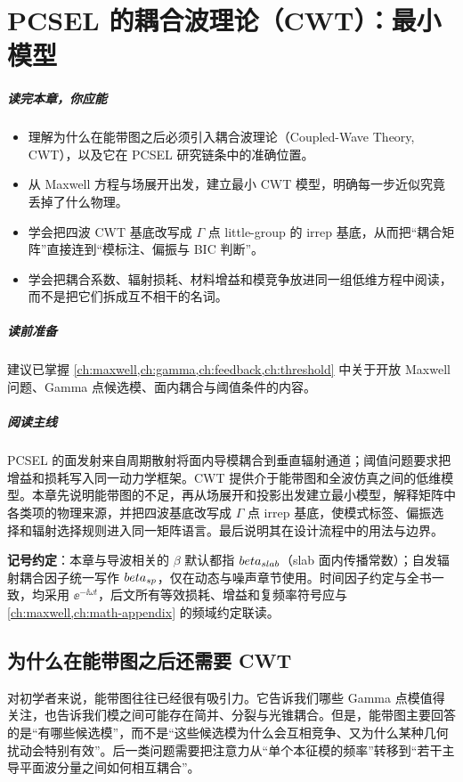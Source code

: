 \chapter{PCSEL 的耦合波理论（CWT）：最小模型}
\label{ch:cwt-min}

\paragraph{读完本章，你应能}
\begin{itemize}
  \item 理解为什么在能带图之后必须引入耦合波理论（Coupled-Wave Theory, CWT），以及它在 PCSEL 研究链条中的准确位置。
  \item 从 Maxwell 方程与场展开出发，建立最小 CWT 模型，明确每一步近似究竟丢掉了什么物理。
  \item 学会把四波 CWT 基底改写成 $\Gamma$ 点 little-group 的 irrep 基底，从而把“耦合矩阵”直接连到“模标注、偏振与 BIC 判断”。
  \item 学会把耦合系数、辐射损耗、材料增益和模竞争放进同一组低维方程中阅读，而不是把它们拆成互不相干的名词。
\end{itemize}

\paragraph{读前准备}
建议已掌握 \cref{ch:maxwell,ch:gamma,ch:feedback,ch:threshold} 中关于开放 Maxwell 问题、Gamma 点候选模、面内耦合与阈值条件的内容。

\paragraph{阅读主线}
PCSEL 的面发射来自周期散射将面内导模耦合到垂直辐射通道；阈值问题要求把增益和损耗写入同一动力学框架。CWT 提供介于能带图和全波仿真之间的低维模型。本章先说明能带图的不足，再从场展开和投影出发建立最小模型，解释矩阵中各类项的物理来源，并把四波基底改写成 $\Gamma$ 点 irrep 基底，使模式标签、偏振选择和辐射选择规则进入同一矩阵语言。最后说明其在设计流程中的用法与边界。

\noindent\textbf{记号约定}：本章与导波相关的 $\beta$ 默认都指 $beta_{slab}$（slab 面内传播常数）；自发辐射耦合因子统一写作 $beta_{sp}$，仅在动态与噪声章节使用。时间因子约定与全书一致，均采用 $\ee^{-\ii\omega t}$，后文所有等效损耗、增益和复频率符号应与 \cref{ch:maxwell,ch:math-appendix} 的频域约定联读。

\section{为什么在能带图之后还需要 CWT}
对初学者来说，能带图往往已经很有吸引力。它告诉我们哪些 Gamma 点模值得关注，也告诉我们模之间可能存在简并、分裂与光锥耦合。但是，能带图主要回答的是“有哪些候选模”，而不是“这些候选模为什么会互相竞争、又为什么某种几何扰动会特别有效”。后一类问题需要把注意力从“单个本征模的频率”转移到“若干主导平面波分量之间如何相互耦合”。

